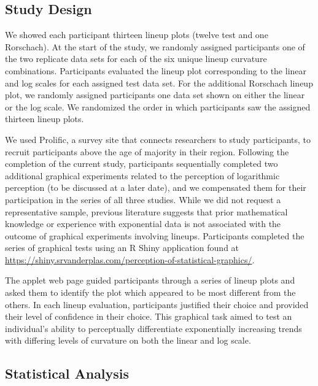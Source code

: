 \documentclass[12pt]{article}
\begin{document}
\hypertarget{study-design}{%
\subsection{Study Design}\label{study-design}}

We showed each participant thirteen lineup plots (twelve test and one
Rorschach). At the start of the study, we randomly assigned participants
one of the two replicate data sets for each of the six unique lineup
curvature combinations. Participants evaluated the lineup plot
corresponding to the linear and log scales for each assigned test data
set. For the additional Rorschach lineup plot, we randomly assigned
participants one data set shown on either the linear or the log scale.
We randomized the order in which participants saw the assigned thirteen
lineup plots.

We used Prolific, a survey site that connects researchers to study
participants, to recruit participants above the age of majority in their
region. Following the completion of the current study, participants
sequentially completed two additional graphical experiments related to
the perception of logarithmic perception (to be discussed at a later
date), and we compensated them for their participation in the series of
all three studies. While we did not request a representative sample,
previous literature suggests that prior mathematical knowledge or
experience with exponential data is not associated with the outcome of
graphical experiments involving lineups\citep{vanderplas2015spatial}.
Participants completed the series of graphical tests using an R Shiny
\citep{shiny_pkg} application found at
\url{https://shiny.srvanderplas.com/perception-of-statistical-graphics/}.

The applet web page guided participants through a series of lineup plots
and asked them to identify the plot which appeared to be most different
from the others. In each lineup evaluation, participants justified their
choice and provided their level of confidence in their choice. This
graphical task aimed to test an individual's ability to perceptually
differentiate exponentially increasing trends with differing levels of
curvature on both the linear and log scale.

\hypertarget{statistical-analysis}{%
\subsection{Statistical Analysis}\label{statistical-analysis}}
\end{document}
